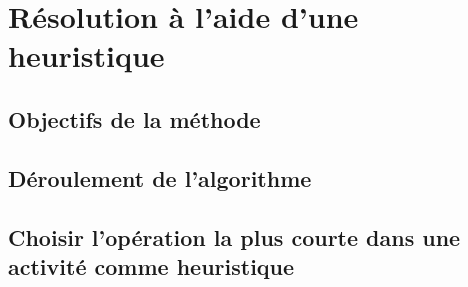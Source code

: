 \section{Résolution à l'aide d'une heuristique}

\subsection{Objectifs de la méthode}

\subsection{Déroulement de l'algorithme}



\subsection{Choisir l'opération la plus courte dans une activité comme heuristique}

